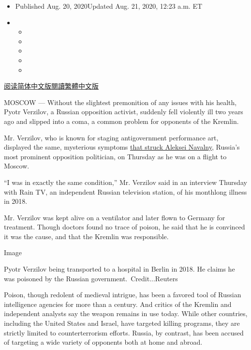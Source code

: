\begin{itemize}
\item
  Published Aug. 20, 2020Updated Aug. 21, 2020, 12:23 a.m. ET
\item
  \begin{itemize}
  \item
  \item
  \item
  \item
  \item
  \end{itemize}
\end{itemize}

\href{https://cn.nytimes3xbfgragh.onion/world/20200821/navalny-poison-russia-kremlin/}{阅读简体中文版}\href{https://cn.nytimes3xbfgragh.onion/world/20200821/navalny-poison-russia-kremlin/zh-hant/}{閱讀繁體中文版}

MOSCOW --- Without the slightest premonition of any issues with his
health, Pyotr Verzilov, a Russian opposition activist, suddenly fell
violently ill two years ago and slipped into a coma, a common problem
for opponents of the Kremlin.

Mr. Verzilov, who is known for staging antigovernment performance art,
displayed the same, mysterious symptoms
\href{https://www.nytimes3xbfgragh.onion/2020/08/20/world/europe/navalny-poison-russia.html}{that
struck Aleksei Navalny}, Russia's most prominent opposition politician,
on Thursday as he was on a flight to Moscow.

``I was in exactly the same condition,'' Mr. Verzilov said in an
interview Thursday with Rain TV, an independent Russian television
station, of his monthlong illness in 2018.

Mr. Verzilov was kept alive on a ventilator and later flown to Germany
for treatment. Though doctors found no trace of poison, he said that he
is convinced it was the cause, and that the Kremlin was responsible.

Image

Pyotr Verzilov being transported to a hospital in Berlin in 2018. He
claims he was poisoned by the Russian government.~Credit...Reuters

Poison, though redolent of medieval intrigue, has been a favored tool of
Russian intelligence agencies for more than a century. And critics of
the Kremlin and independent analysts say the weapon remains in use
today. While other countries, including the United States and Israel,
have targeted killing programs, they are strictly limited to
counterterrorism efforts. Russia, by contrast, has been accused of
targeting a wide variety of opponents both at home and abroad.

